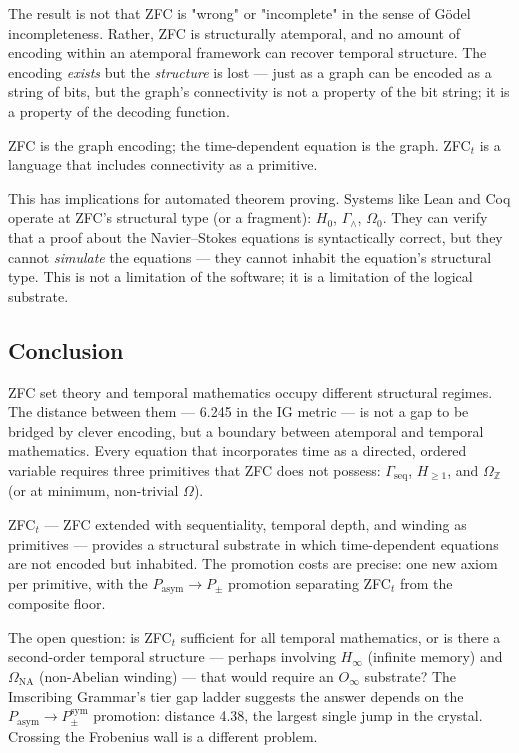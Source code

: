 \documentclass[12pt,a4paper]{article}
\begin{document}
The result is not that ZFC is "wrong" or "incomplete" in the sense of Gödel incompleteness. Rather, ZFC is structurally atemporal, and no amount of encoding within an atemporal framework can recover temporal structure. The encoding \emph{exists} but the \emph{structure} is lost --- just as a graph can be encoded as a string of bits, but the graph's connectivity is not a property of the bit string; it is a property of the decoding function.

ZFC is the graph encoding; the time-dependent equation is the graph. ZFC$_t$ is a language that includes connectivity as a primitive.

This has implications for automated theorem proving. Systems like Lean and Coq operate at ZFC's structural type (or a fragment): $H_0$, $\Gamma_{\wedge}$, $\Omega_0$. They can verify that a proof about the Navier--Stokes equations is syntactically correct, but they cannot \emph{simulate} the equations --- they cannot inhabit the equation's structural type. This is not a limitation of the software; it is a limitation of the logical substrate.

\subsection{Conclusion}

ZFC set theory and temporal mathematics occupy different structural regimes. The distance between them --- 6.245 in the IG metric --- is not a gap to be bridged by clever encoding, but a boundary between atemporal and temporal mathematics. Every equation that incorporates time as a directed, ordered variable requires three primitives that ZFC does not possess: $\Gamma_\text{seq}$, $H_{\geq 1}$, and $\Omega_\mathbb{Z}$ (or at minimum, non-trivial $\Omega$).

ZFC$_t$ --- ZFC extended with sequentiality, temporal depth, and winding as primitives --- provides a structural substrate in which time-dependent equations are not encoded but inhabited. The promotion costs are precise: one new axiom per primitive, with the $P_\text{asym} \to P_{\pm}$ promotion separating ZFC$_t$ from the composite floor.

The open question: is ZFC$_t$ sufficient for all temporal mathematics, or is there a second-order temporal structure --- perhaps involving $H_{\infty}$ (infinite memory) and $\Omega_\text{NA}$ (non-Abelian winding) --- that would require an $O_{\infty}$ substrate? The Imscribing Grammar's tier gap ladder suggests the answer depends on the $P_\text{asym} \to P_{\pm}^{\text{sym}}$ promotion: distance 4.38, the largest single jump in the crystal. Crossing the Frobenius wall is a different problem.
\end{document}
